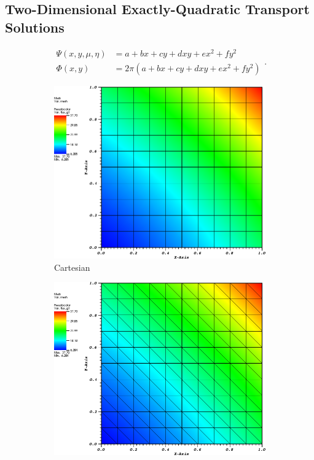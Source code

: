 \subsection{Two-Dimensional Exactly-Quadratic Transport Solutions}
\label{sec::BF_Results_Quadratic}

\begin{equation}
\label{eq::BF_Results_Quadratic_fluxsols}
\begin{aligned}
\Psi (x,y,\mu,\eta) &= a + bx + c y+ d xy + e x^2 + fy^2 \\
\Phi (x,y) &= 2 \pi \left(  a + bx + c y+ d xy + e x^2 + fy^2 \right)
\end{aligned} .
\end{equation}


\begin{figure}
\centering
{
	\begin{subfigure}[b]{0.465\textwidth}
		\centering
		\label{subfig::cart_me_k2_lin_sol}
		\includegraphics[width=\textwidth]{figures/sec_BF/quad_sol_cart.png}
		\caption{Cartesian}
	\end{subfigure}
	\hfill
	\begin{subfigure}[b]{0.465\textwidth}
		\centering
		\label{subfig::tri_me_k2_lin_sol}
		\includegraphics[width=\textwidth]{figures/sec_BF/quad_sol_tri.png}

\end{subfigure}}
\end{figure}

